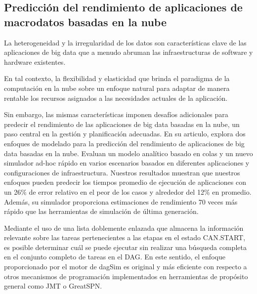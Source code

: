 \documentclass[10pt,journal]{IEEEtran}
\begin{document}
\subsection{\textbf{Predicción del rendimiento de aplicaciones de macrodatos basadas en la nube}}
La heterogeneidad y la irregularidad de los datos son características clave de las aplicaciones de big data que a menudo abruman las infraestructuras de software y hardware existentes.\par En tal contexto, la flexibilidad y elasticidad que brinda el paradigma de la computación en la nube sobre un enfoque natural para adaptar de manera rentable los recursos asignados a las necesidades actuales de la aplicación. \par Sin embargo, las mismas características imponen desafíos adicionales para predecir el rendimiento de las aplicaciones de big data basadas en la nube, un paso central en la gestión y planificación adecuadas. En su articulo, \citep{arda} explora dos enfoques de modelado para la predicción del rendimiento de aplicaciones de big data basadas en la nube. Evaluan un modelo analítico basado en colas y un nuevo simulador ad-hoc rápido en varios escenarios basados en diferentes aplicaciones y configuraciones de infraestructura. Nuestros resultados muestran que nuestros enfoques pueden predecir los tiempos promedio de ejecución de aplicaciones con un 26\% de error relativo en el peor de los casos y alrededor del 12\% en promedio. Además, su simulador proporciona estimaciones de rendimiento 70 veces más rápido que las herramientas de simulación de última generación.

Mediante el uso de una lista doblemente enlazada que almacena la información relevante sobre las tareas pertenecientes a las etapas en el estado CAN.START, es posible determinar cuál se puede ejecutar sin realizar una búsqueda completa en el conjunto completo de tareas en el DAG. En este sentido, el enfoque proporcionado por el motor de dagSim es original y más eficiente con respecto a otros mecanismos de programación implementados en herramientas de propósito general como JMT o GreatSPN.
\end{document}
